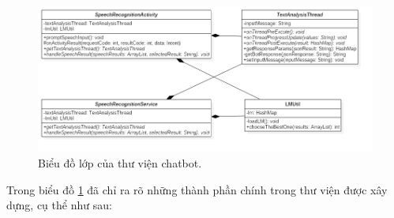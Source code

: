 \documentclass[12pt]{report}
\begin{document}
\begin{figure}[H]
	\centering
	\includegraphics[width=15cm]{Pics/Chap6/library-model.png}
	\caption{Biểu đồ lớp của thư viện chatbot.}
	\label{fig:library-model}
\end{figure}

Trong biểu đồ \ref{fig:library-model} đã chỉ ra rõ những thành phần chính trong thư viện được xây dựng, cụ thể như sau:
\end{document}
